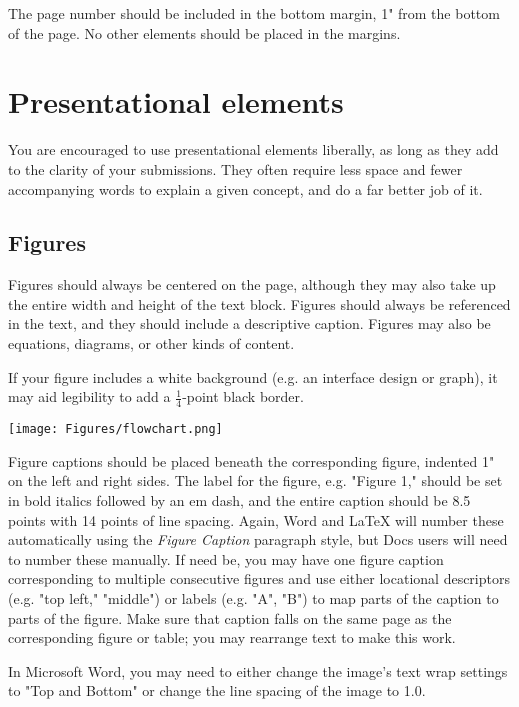 \documentclass[
	letterpaper, %
]{jdf}
\begin{document}
\begin{Abstract}
The page number should be included in the bottom margin, 1" from the bottom of the page. No other elements should be placed in the margins.

\section{Presentational elements}
You are encouraged to use presentational elements liberally, as long as they add to the clarity of your submissions. They often require less space and fewer accompanying words to explain a given concept, and do a far better job of it.

\subsection{Figures}
Figures should always be centered on the page, although they may also take up the entire width and height of the text block. Figures should always be referenced in the text, and they should include a descriptive caption. Figures may also be equations, diagrams, or other kinds of content.

If your figure includes a white background (e.g. an interface design or graph), it may aid legibility to add a \(\frac{1}{4}\)-point black border.

\begin{jdffigure}
\texttt{[image: Figures/flowchart.png]}%
\label{fig:flowchart}%
\end{jdffigure}

Figure captions should be placed beneath the corresponding figure, indented 1" on the left and right sides. The label for the figure, e.g. "Figure 1," should be set in bold italics followed by an em dash, and the entire caption should be 8.5 points with 14 points of line spacing. Again, Word and LaTeX will number these automatically using the \emph{Figure Caption} paragraph style, but Docs users will need to number these manually. If need be, you may have one figure caption corresponding to multiple consecutive figures and use either locational descriptors (e.g. "top left," "middle") or labels (e.g. "A", "B") to map parts of the caption to parts of the figure. Make sure that caption falls on the same page as the corresponding figure or table; you may rearrange text to make this work.

In Microsoft Word, you may need to either change the image’s text wrap settings to "Top and Bottom" or change the line spacing of the image to 1.0.


\end{Abstract}
\end{document}
